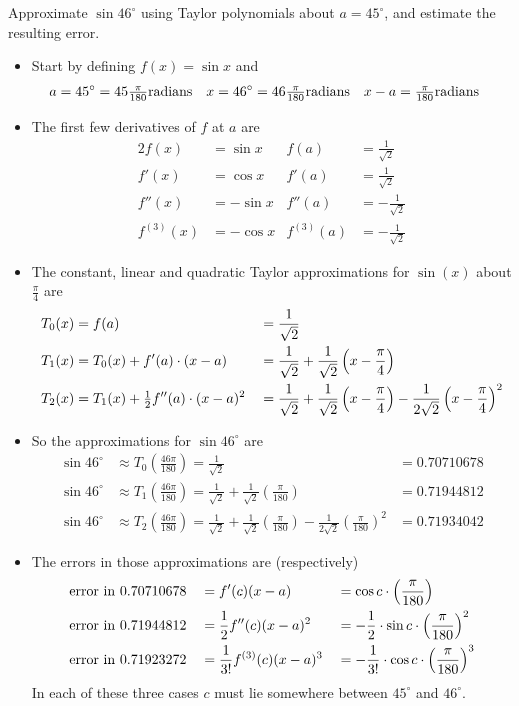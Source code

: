 \begin{eg}\label{eg:taylorErrorSin}
Approximate $\sin 46^\circ$ using Taylor polynomials about
$a=45^\circ$, and estimate the resulting error.

\soln
\begin{itemize}
 \item Start by defining $f(x) = \sin x$ and
\begin{align*}
a&=45^\circ=45\tfrac{\pi}{180} {\rm radians}&
x&=46^\circ=46\tfrac{\pi}{180} {\rm radians}&
x-a&=\tfrac{\pi}{180} {\rm radians}
\end{align*}
\item The first few derivatives of $f$ at $a$ are
\begin{alignat*}{2}
f(x)&=\sin x
&f(a)&=\frac{1}{\sqrt{2}}\\
f'(x)&=\cos x &
f'(a)&=\frac{1}{\sqrt{2}}\\
f''(x)&=-\sin x &
f''(a)&=-\frac{1}{\sqrt{2}}\\
f^{(3)}(x)&=-\cos x &
f^{(3)}(a)&=-\frac{1}{\sqrt{2}}
\end{alignat*}
\item
The constant, linear and quadratic Taylor approximations for $\sin(x)$ about
$\frac{\pi}{4}$ are
\begin{alignat*}{4}
  T_0(x) &= f(a)
    &&= \frac{1}{\sqrt{2}} \\
  T_1(x) &= T_0(x) + f'(a) \cdot(x-a)
    &&= \frac{1}{\sqrt{2}} + \frac{1}{\sqrt{2}}\left(x - \frac{\pi}{4} \right)\\
  T_2(x) &= T_1(x) + \tfrac{1}{2} f''(a) \cdot(x-a)^2
    &&=  \frac{1}{\sqrt{2}} + \frac{1}{\sqrt{2}}\left(x - \frac{\pi}{4} \right)
  - \frac{1}{2\sqrt{2}}\left(x - \frac{\pi}{4} \right)^2
\end{alignat*}
\item So the approximations for $\sin 46^\circ$ are
\begin{align*}
\sin46^\circ &\approx T_0\left(\frac{46\pi}{180}\right) = \frac{1}{\sqrt{2}} &
=0.70710678\\
\sin46^\circ &\approx T_1\left(\frac{46\pi}{180}\right)
= \frac{1}{\sqrt{2}} + \frac{1}{\sqrt{2}} \left(\frac{\pi}{180}\right)
&=0.71944812\\
\sin46^\circ&\approx T_2\left(\frac{46\pi}{180}\right)
= \frac{1}{\sqrt{2}} + \frac{1}{\sqrt{2}} \left(\frac{\pi}{180}\right)
- \frac{1}{2\sqrt{2}}\left(\frac{\pi}{180}\right)^2
 &=0.71934042
\end{align*}
\item The errors in those approximations are (respectively)
\begin{alignat*}{3}
&{\rm error\ in\ 0.70710678}&
     &=f'(c)(x-a)&
     &=\cos c \cdot \left(\frac{\pi}{180}\right)\\
%
&{\rm error\ in\ 0.71944812}&
   &=\frac{1}{2} f''(c)(x-a)^2&
   &=-\frac{1}{2} \cdot \sin c\cdot \left(\frac{\pi}{180}\right)^2\\
&{\rm error\ in\ 0.71923272}&
   &=\frac{1}{3!}f^{(3)}(c)(x-a)^3&
   &=-\frac{1}{3!}\cdot \cos c \cdot \left(\frac{\pi}{180}\right)^3
\end{alignat*}
In each of these three cases $c$ must lie somewhere between $45^\circ$ and
$46^\circ$.


\end{itemize}
\end{eg}
